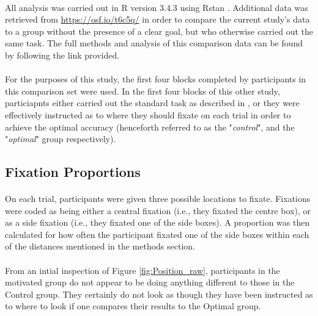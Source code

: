 \documentclass[12pt]{article}
\begin{document}
\paragraph{} All analysis was carried out in R version 3.4.3 \citep{R} using Rstan \citep{Rstan,Stan}. Additional data was retrieved from \url{https://osf.io/t6c5q/} in order to compare the current study's data to a group without the presence of a clear goal, but who otherwise carried out the same task. The full methods and analysis of this comparison data can be found by following the link provided. 

\paragraph{} For the purposes of this study, the first four blocks completed by participants in this comparison set were used. In the first four blocks of this other study, particiapnts either carried out the standard task as described in \cite{clarke2015failure}, or they were effectively instructed as to where they should fixate on each trial in order to achieve the optimal accuracy (henceforth referred to as the "\textit{control}", and the "\textit{optimal}" group respectively).

\subsection*{Fixation Proportions}
\paragraph{} On each trial, participants were given three possible locations to fixate. Fixations were coded as being either a central fixation (i.e., they fixated the centre box), or as a side fixation (i.e., they fixated one of the side boxes). A proportion was then calculated for how often the participant fixated one of the side boxes within each of the distances mentioned in the methods section. 

\paragraph{} From an intial inspection of Figure \ref{fig:Position_raw}, participants in the motivated group do not appear to be doing anything different to those in the Control group. They certainly do not look as though they have been instructed as to where to look if one compares their results to the Optimal group. 
\end{document}
